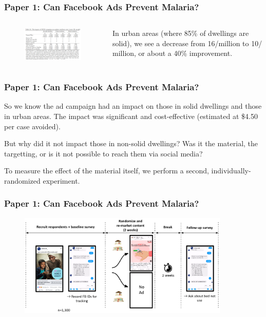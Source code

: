 \documentclass[aspectratio=169]{beamer}
\begin{document}
\begin{frame}
\frametitle{Paper 1: Can Facebook Ads Prevent Malaria?}

\begin{columns}
  


\begin{figure}[]
\includegraphics[width=300px]{resources/incidence-regression.png} 
\end{figure} 


In urban areas (where 85\% of dwellings are solid), we see a decrease from 16/million to 10/ million, or about a 40\% improvement. 
   
\end{columns}
  
\end{frame}

\begin{frame}
\frametitle{Paper 1: Can Facebook Ads Prevent Malaria?}

So we know the ad campaign had an impact on those in solid dwellings and those in urban areas. The impact was significant and cost-effective (estimated at \$4.50 per case avoided). 

But why did it not impact those in non-solid dwellings? Was it the material, the targetting, or is it not possible to reach them via social media? 

To measure the effect of the material itself, we perform a second, individually-randomized experiment. 
  
\end{frame}


\begin{frame}
\frametitle{Paper 1: Can Facebook Ads Prevent Malaria?}


\begin{figure}[]
\includegraphics[width=380px]{resources/individual-study-flow.png} 
\end{figure} 

\end{frame}
\end{document}
